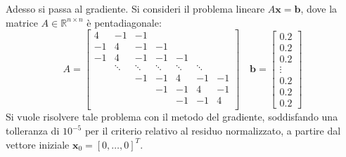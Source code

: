 \longline

\noindent
Adesso si passa al gradiente. Si consideri il problema lineare $A\mathbf{x} = \mathbf{b}$, dove la matrice $A \in \mathbb{R}^{n \times n}$ è pentadiagonale:
\begin{equation*}
    A = \begin{bmatrix}
        4 & -1 & -1 & & & & \\
        -1 & 4 & -1 & -1 & & & \\
        -1 & 4 & -1 & -1 & -1 & & \\
         & \ddots & \ddots & \ddots & \ddots & \ddots & \\
         & & -1 & -1 & 4 & -1 & -1 \\
         & & & -1 & -1 & 4 & -1 \\
         & & & & -1 & -1 & 4 \\
    \end{bmatrix}
    \hspace{1em}
    \mathbf{b} = \begin{bmatrix}
        0.2 \\ 0.2 \\ 0.2 \\ \vdots \\ 0.2 \\ 0.2 \\ 0.2
    \end{bmatrix}
\end{equation*}
Si vuole risolvere tale problema con il metodo del gradiente, soddisfando una tolleranza di $10^{-5}$ per il criterio relativo al residuo normalizzato, a partire dal vettore iniziale $\mathbf{x}_{0} = \left[0, \dots, 0\right]^{T}$.
